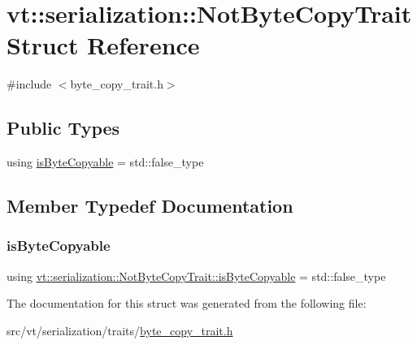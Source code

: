 \hypertarget{structvt_1_1serialization_1_1_not_byte_copy_trait}{}\section{vt\+:\+:serialization\+:\+:Not\+Byte\+Copy\+Trait Struct Reference}
\label{structvt_1_1serialization_1_1_not_byte_copy_trait}


{\ttfamily \#include $<$byte\+\_\+copy\+\_\+trait.\+h$>$}

\subsection*{Public Types}
\begin{DoxyCompactItemize}
\item 
using \hyperlink{structvt_1_1serialization_1_1_not_byte_copy_trait_a2aa18ab90b4c6c1fc73e02dab3d9869e}{is\+Byte\+Copyable} = std\+::false\+\_\+type
\end{DoxyCompactItemize}


\subsection{Member Typedef Documentation}
\mbox{\label{structvt_1_1serialization_1_1_not_byte_copy_trait_a2aa18ab90b4c6c1fc73e02dab3d9869e}} 
\subsubsection{\texorpdfstring{is\+Byte\+Copyable}{isByteCopyable}}
{\footnotesize\ttfamily using \hyperlink{structvt_1_1serialization_1_1_not_byte_copy_trait_a2aa18ab90b4c6c1fc73e02dab3d9869e}{vt\+::serialization\+::\+Not\+Byte\+Copy\+Trait\+::is\+Byte\+Copyable} =  std\+::false\+\_\+type}



The documentation for this struct was generated from the following file\+:\begin{DoxyCompactItemize}
\item 
src/vt/serialization/traits/\hyperlink{byte__copy__trait_8h}{byte\+\_\+copy\+\_\+trait.\+h}\end{DoxyCompactItemize}
